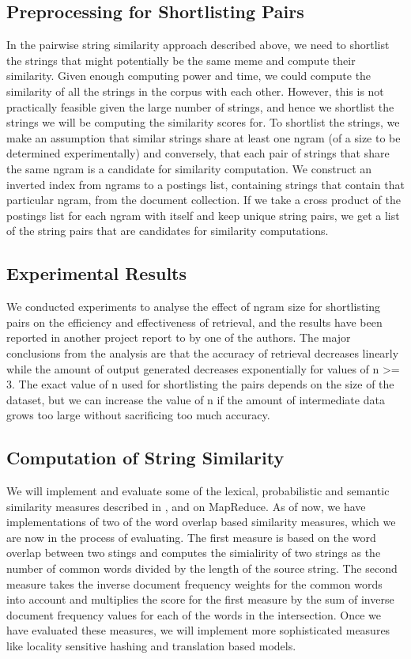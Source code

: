 \documentclass{acm_proc_article-sp}
\begin{document}
\subsection{Preprocessing for Shortlisting Pairs}
In the pairwise string similarity approach described above, we need to shortlist the strings that might potentially be the same meme and compute their similarity. Given enough computing power and time, we could compute the similarity of all the strings in the corpus with each other. However, this is not practically feasible given the large number of strings, and hence we shortlist the strings we will be computing the similarity scores for. To shortlist the strings, we make an assumption that similar strings share at least one ngram (of a size to be determined experimentally) and conversely, that each pair of strings that share the same ngram is a candidate for similarity computation. We construct an inverted index from ngrams to a postings list, containing strings that contain that particular ngram, from the document collection. If we take a cross product of the postings list for each ngram with itself and keep unique string pairs, we get a list of the string pairs that are candidates for similarity computations.

\subsection{Experimental Results}
We conducted experiments to analyse the effect of ngram size for shortlisting pairs on the efficiency and effectiveness of retrieval, and the results have been reported in another project report to by one of the authors. The major conclusions from the analysis are that the accuracy of retrieval decreases linearly while the amount of output generated decreases exponentially for values of n >= 3. The exact value of n used for shortlisting the pairs depends on the size of the dataset, but we can increase the value of n if the amount of intermediate data grows too large without sacrificing too much accuracy.

\subsection{Computation of String Similarity}
We will implement and evaluate some of the lexical, probabilistic and semantic similarity measures described in \cite{balasubramanian2007comparison}, \cite{achananuparp2008evaluation} and \cite{metzler2007similarity} on MapReduce. As of now, we have implementations of two of the word overlap based similarity measures, which we are now in the process of evaluating. The first measure is based on the word overlap between two stings and computes the simialirity of two strings as the number of common words divided by the length of the source string. The second measure takes the inverse document frequency weights for the common words into account and multiplies the score for the first measure by the sum of inverse document frequency values for each of the words in the intersection. Once we have evaluated these measures, we will implement more sophisticated measures like locality sensitive hashing and translation based models.
\end{document}
